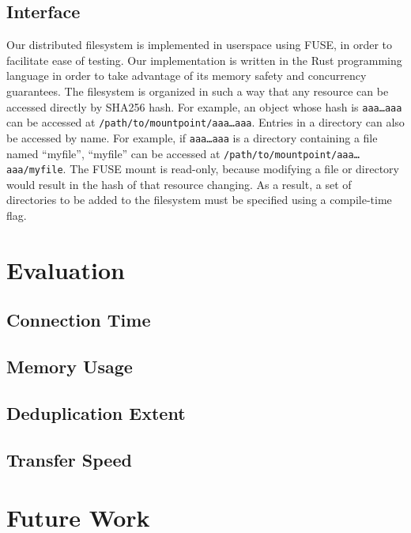 \documentclass[twocolumn]{article}
\begin{document}
\subsection{Interface}

Our distributed filesystem is implemented in userspace using FUSE, in order to facilitate ease of testing.
Our implementation is written in the Rust programming language in order to take advantage of its memory safety and concurrency guarantees.
The filesystem is organized in such a way that any resource can be accessed directly by SHA256 hash.
For example, an object whose hash is \texttt{aaa\dots aaa} can be accessed at \texttt{/path/to/mountpoint/aaa\dots aaa}.
Entries in a directory can also be accessed by name.
For example, if \texttt{aaa\dots aaa} is a directory containing a file named ``myfile'', ``myfile'' can be accessed at \texttt{/path/to/mountpoint/aaa\dots aaa/myfile}.
The FUSE mount is read-only, because modifying a file or directory would result in the hash of that resource changing.
As a result, a set of directories to be added to the filesystem must be specified using a compile-time flag.


\section{Evaluation}

\subsection{Connection Time}
\subsection{Memory Usage}
\subsection{Deduplication Extent}
\subsection{Transfer Speed}

\section{Future Work}
\end{document}
